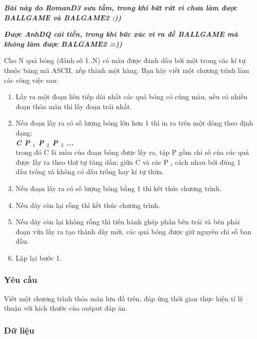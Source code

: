 







\textbf{\emph{     Bài này do RomanD3 sưu tầm, trong khi bứt rứt vì chưa làm được BALLGAME và BALGAME2 :))    }}

\textbf{\emph{     Được AnhDQ cải tiến, trong khi bức xúc vì ra đề BALLGAME mà không làm được BALGAME2 =))    }}

   Cho N quả bóng (đánh số 1..N) có màu được đánh dấu bởi một trong các kí tự thuộc bảng mã ASCII, xếp thành một hàng. Bạn hãy viết một chương trình làm các công việc sau:  
\begin{enumerate}
	\item     Lấy ra một đoạn liên tiếp dài nhất các quả bóng có cùng màu, nếu có nhiều đoạn thỏa mãn thì lấy đoạn trái nhất.   
	\item     Nếu đoạn lấy ra có số lượng bóng lớn hơn 1 thì in ra trên một dòng theo định dạng:    
\\\textbf{\emph{      C P      $_       1      $      P      $_       2      $      P      $_       3      $      ...     }}
\\    trong đó C là màu của đoạn bóng được lấy ra, tập P gồm chỉ số của các quả được lấy ra theo thứ tự tăng dần; giữa C và các P    $_     i    $    cách nhau bởi đúng 1 dấu trống và không có dấu trống hay kí tự thừa.   
	\item     Nếu đoạn lấy ra có số lượng bóng bằng 1 thì kết thúc chương trình.   
	\item     Nếu dãy còn lại rỗng thì kết thúc chương trình.   
	\item     Nếu dãy còn lại không rỗng thì tiến hành ghép phần bên trái và bên phải đoạn vừa lấy ra tạo thành dãy mới, các quả bóng được giữ nguyên chỉ số ban đầu.   
	\item     Lặp lại bước 1.   
\end{enumerate}

\subsubsection{   Yêu cầu  }

   Viết một chương trình thỏa mãn lưu đồ trên, đáp ứng thời gian thực hiện tỉ lệ thuận với kích thước của output đáp án.  

\subsubsection{   Dữ liệu  }

